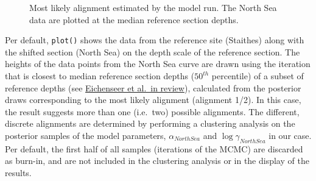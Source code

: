 \documentclass[
  letterpaper,
  DIV=11,
  numbers=noendperiod]{scrartcl}
\begin{document}
\begin{figure}[H]


\caption{\label{fig-6}Most likely alignment estimated by the model run.
The North Sea data are plotted at the median reference section depths.}

\end{figure}%

Per default, \texttt{plot()} shows the data from the reference site
(Staithes) along with the shifted section (North Sea) on the depth scale
of the reference section. The heights of the data points from the North
Sea curve are drawn using the iteration that is closest to median
reference section depths (\(50^{th}\) percentile) of a subset of
reference depths (see
\href{https://egusphere.copernicus.org/preprints/2025/egusphere-2025-1355/}{Eichenseer
et al.~in review}), calculated from the posterior draws corresponding to
the most likely alignment (alignment 1/2). In this case, the result
suggests more than one (i.e.~two) possible alignments. The different,
discrete alignments are determined by performing a clustering analysis
on the posterior samples of the model parameters, \(\alpha_{North Sea}\)
and \(\log \gamma_{North Sea}\) in our case. Per default, the first half
of all samples (iterations of the MCMC) are discarded as burn-in, and
are not included in the clustering analysis or in the display of the
results.
\end{document}
